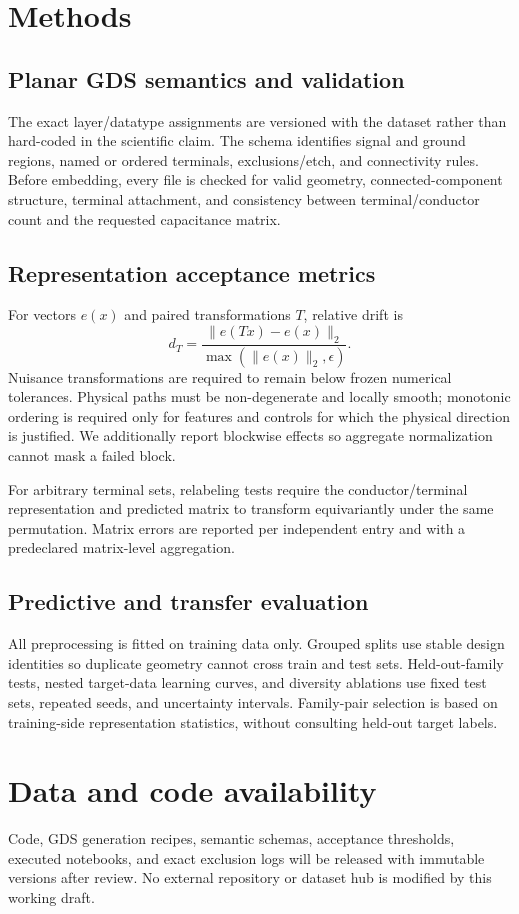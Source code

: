 \documentclass[11pt]{article}
\begin{document}
\section*{Methods}

\subsection*{Planar GDS semantics and validation}
The exact layer/datatype assignments are versioned with the dataset rather than
hard-coded in the scientific claim. The schema identifies signal and ground
regions, named or ordered terminals, exclusions/etch, and connectivity rules.
Before embedding, every file is checked for valid geometry, connected-component
structure, terminal attachment, and consistency between terminal/conductor
count and the requested capacitance matrix.

\subsection*{Representation acceptance metrics}
For vectors $e(x)$ and paired transformations $T$, relative drift is
\begin{equation}
  d_T = \frac{\lVert e(Tx)-e(x)\rVert_2}
  {\max(\lVert e(x)\rVert_2,\epsilon)}.
\end{equation}
Nuisance transformations are required to remain below frozen numerical
tolerances. Physical paths must be non-degenerate and locally smooth; monotonic
ordering is required only for features and controls for which the physical
direction is justified. We additionally report blockwise effects so aggregate
normalization cannot mask a failed block.

For arbitrary terminal sets, relabeling tests require the conductor/terminal
representation and predicted matrix to transform equivariantly under the same
permutation. Matrix errors are reported per independent entry and with a
predeclared matrix-level aggregation.

\subsection*{Predictive and transfer evaluation}
All preprocessing is fitted on training data only. Grouped splits use stable
design identities so duplicate geometry cannot cross train and test sets.
Held-out-family tests, nested target-data learning curves, and diversity
ablations use fixed test sets, repeated seeds, and uncertainty intervals.
Family-pair selection is based on training-side representation statistics,
without consulting held-out target labels.

\section*{Data and code availability}
Code, GDS generation recipes, semantic schemas, acceptance thresholds, executed
notebooks, and exact exclusion logs will be released with immutable versions
after review. No external repository or dataset hub is modified by this working
draft.



\end{document}
